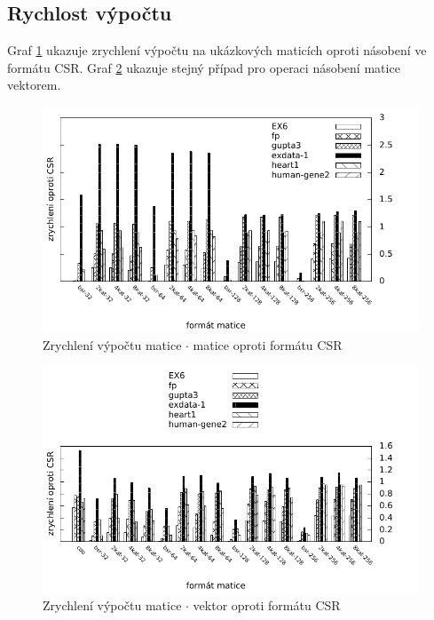 \subsection{Rychlost výpočtu}

Graf \ref{fig:mmmspeed} ukazuje zrychlení výpočtu na ukázkových maticích oproti násobení ve formátu CSR. Graf \ref{fig:mvmspeed} ukazuje stejný případ pro operaci násobení matice vektorem.

\begin{figure}[H]
	\includegraphics[width=1.0\textwidth]{./images/measure1/mmm-speedup}
	\caption{Zrychlení výpočtu matice $\cdot$ matice oproti formátu CSR}
	\label{fig:mmmspeed}
\end{figure}

\begin{figure}[H]
	\includegraphics[width=1.0\textwidth]{./images/measure1/mvm-speedup}
	\caption{Zrychlení výpočtu matice $\cdot$ vektor oproti formátu CSR}
	\label{fig:mvmspeed}
\end{figure}

